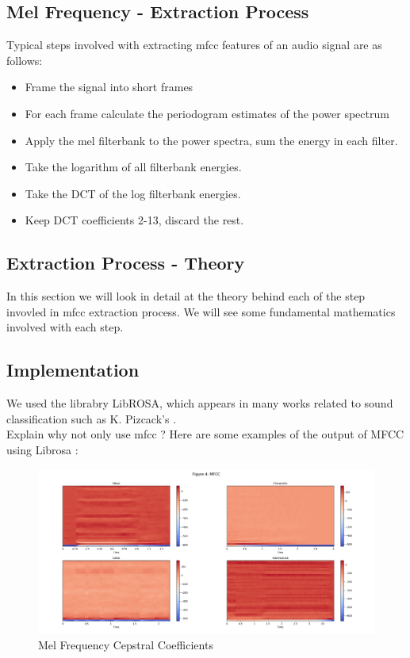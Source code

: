 \documentclass{article} %
\begin{document}
	\subsection{Mel Frequency - Extraction Process}
	Typical steps involved with extracting mfcc features of an audio signal are as follows:
    \begin{itemize}
        \item Frame the signal into short frames
        \item For each frame calculate the periodogram estimates of the power spectrum
        \item Apply the mel filterbank to the power spectra, sum the energy in each filter.
        \item Take the logarithm of all filterbank energies.
        \item Take the DCT of the log filterbank energies.
        \item Keep DCT coefficients 2-13, discard the rest.
    \end{itemize}
    \subsection{Extraction Process - Theory}
	In this section we will look in detail at the theory behind each of the step invovled in mfcc extraction process. We will see some fundamental mathematics involved with each step.
	\subsection{Implementation}
		We used the librabry LibROSA, which appears in many works related to sound classification such as K. Pizcack's \cite{cite2}.\\

		Explain why not only use mfcc ?
		\newline
		Here are some examples of the output of MFCC using Librosa :
		\begin{figure}
		  \includegraphics[width=\linewidth]{mfcc.png}
		  \caption{Mel Frequency Cepstral Coefficients}
		\end{figure}
\end{document}
